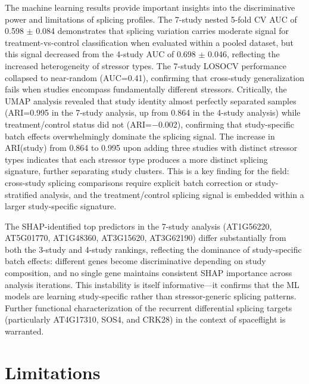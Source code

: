 \documentclass[12pt,a4paper]{article}
\begin{document}
The machine learning results provide important insights into the discriminative power and limitations of splicing profiles. The 7-study nested 5-fold CV AUC of 0.598 $\pm$ 0.084 demonstrates that splicing variation carries moderate signal for treatment-vs-control classification when evaluated within a pooled dataset, but this signal decreased from the 4-study AUC of 0.698 $\pm$ 0.046, reflecting the increased heterogeneity of stressor types. The 7-study LOSOCV performance collapsed to near-random (AUC=0.41), confirming that cross-study generalization fails when studies encompass fundamentally different stressors. Critically, the UMAP analysis revealed that study identity almost perfectly separated samples (ARI=0.995 in the 7-study analysis, up from 0.864 in the 4-study analysis) while treatment/control status did not (ARI=$-$0.002), confirming that study-specific batch effects overwhelmingly dominate the splicing signal. The increase in ARI(study) from 0.864 to 0.995 upon adding three studies with distinct stressor types indicates that each stressor type produces a more distinct splicing signature, further separating study clusters. This is a key finding for the field: cross-study splicing comparisons require explicit batch correction or study-stratified analysis, and the treatment/control splicing signal is embedded within a larger study-specific signature.

The SHAP-identified top predictors in the 7-study analysis (AT1G56220, AT5G01770, AT1G48360, AT3G15620, AT3G62190) differ substantially from both the 3-study and 4-study rankings, reflecting the dominance of study-specific batch effects: different genes become discriminative depending on study composition, and no single gene maintains consistent SHAP importance across analysis iterations. This instability is itself informative---it confirms that the ML models are learning study-specific rather than stressor-generic splicing patterns. Further functional characterization of the recurrent differential splicing targets (particularly AT4G17310, SOS4, and CRK28) in the context of spaceflight is warranted.

\section{Limitations}
\end{document}
